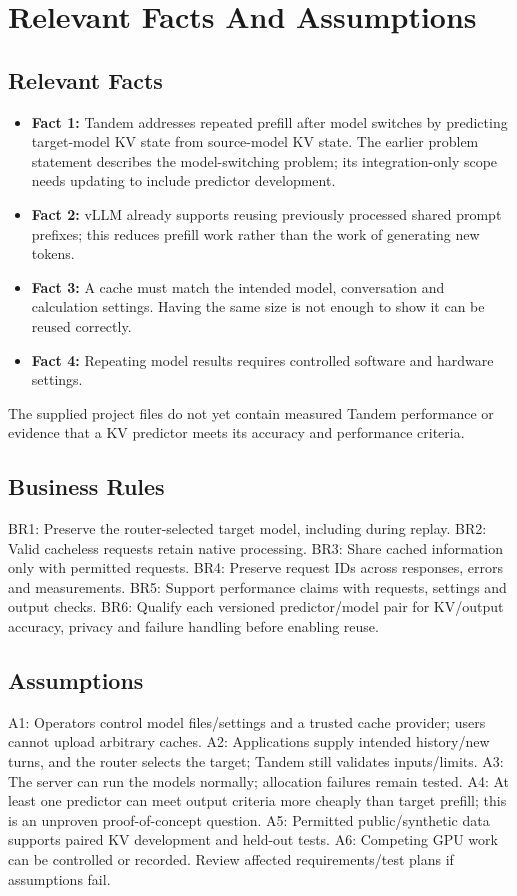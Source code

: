 \documentclass[12pt]{article}
\begin{document}
\section{Relevant Facts And Assumptions}


\subsection{Relevant Facts}
\begin{itemize}
\item \textbf{Fact 1:} Tandem addresses repeated prefill after model switches
by predicting target-model KV state from source-model KV state. The earlier
problem statement describes the model-switching problem; its integration-only
scope needs updating to include predictor development.
\item \textbf{Fact 2:} vLLM already supports reusing previously processed shared prompt prefixes;
this reduces prefill work rather than the work of generating new tokens.
\item \textbf{Fact 3:} A cache must match the intended model, conversation and calculation settings.
Having the same size is not enough to show it can be reused correctly.
\item \textbf{Fact 4:} Repeating model results requires controlled software and hardware settings.
\end{itemize}

The supplied project files do not yet contain measured Tandem performance or
evidence that a KV predictor meets its accuracy and performance criteria.

\subsection{Business Rules}
BR1: Preserve the router-selected target model, including during replay.
BR2: Valid cacheless requests retain native processing.
BR3: Share cached information only with permitted requests.
BR4: Preserve request IDs across responses, errors and measurements.
BR5: Support performance claims with requests, settings and output checks.
BR6: Qualify each versioned predictor/model pair for KV/output accuracy,
privacy and failure handling before enabling reuse.

\subsection{Assumptions}
A1: Operators control model files/settings and a trusted cache provider;
users cannot upload arbitrary caches.
A2: Applications supply intended history/new turns, and the router selects
the target; Tandem still validates inputs/limits.
A3: The server can run the models normally; allocation failures remain tested.
A4: At least one predictor can meet output criteria more cheaply than target
prefill; this is an unproven proof-of-concept question.
A5: Permitted public/synthetic data supports paired KV development and held-out tests.
A6: Competing GPU work can be controlled or recorded.
Review affected requirements/test plans if assumptions fail.
\end{document}
